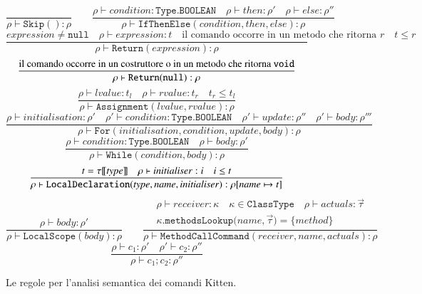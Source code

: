 \begin{figure}[t]
\begin{center}
{\small
  \[
    \frac{}
         {\rho\vdash\mathtt{Skip()}:\rho}\qquad
    \frac{\rho\vdash\mathit{condition}:\mathtt{Type.BOOLEAN}\quad
          \rho\vdash\mathit{then}:\rho'\quad
          \rho\vdash\mathit{else}:\rho''}
         {\rho\vdash\mathtt{IfThenElse(\mathit{condition},\mathit{then},
          \mathit{else}):\rho}}
  \]
  \[
    \frac{\mathit{expression}\not=\mathtt{null}\quad
          \rho\vdash\mathit{expression}:t\quad
          \text{il comando occorre in un metodo che ritorna $r$}
          \quad t\le r}
         {\rho\vdash\mathtt{Return(\mathit{expression})}:\rho}
  \]
  \[
    \frac{\text{il comando occorre in un costruttore o in un metodo che
                ritorna \texttt{void}}}
         {\rho\vdash\mathtt{Return(null)}:\rho}
  \]
  \[
    \frac{\rho\vdash\mathit{lvalue}:t_l\quad\rho\vdash\mathit{rvalue}:t_r
          \quad t_r\le t_l}
         {\rho\vdash\mathtt{Assignment(\mathit{lvalue},\mathit{rvalue})}:\rho}
  \]
  \[
    \frac{\rho\vdash\mathit{initialisation}:\rho'\quad
          \rho'\vdash\mathit{condition}:\mathtt{Type.BOOLEAN}\quad
          \rho'\vdash\mathit{update}:\rho''\quad
          \rho'\vdash\mathit{body}:\rho'''}
         {\rho\vdash\mathtt{For(\mathit{initialisation},\mathit{condition},
          \mathit{update},\mathit{body})}:\rho}
  \]
  \[
    \frac{\rho\vdash\mathit{condition}:\mathtt{Type.BOOLEAN}\quad
          \rho\vdash\mathit{body}:\rho'}
         {\rho\vdash\mathtt{While(\mathit{condition},\mathit{body})}:\rho}
  \]
  \[
    \frac{t={\tau[\![{\mathit{type}}]\!]}\quad\rho\vdash\mathit{initialiser}:i\quad 
          i\le t}
         {\rho\vdash\mathtt{LocalDeclaration(\mathit{type},\mathit{name},
          \mathit{initialiser})}:\rho[\mathit{name}\mapsto t]}
  \]
  \[
    \frac{\rho\vdash\mathit{body}:\rho'}
         {\rho\vdash\mathtt{LocalScope(\mathit{body})}:\rho}
    \qquad
     \frac{\begin{array}{c}
       \rho\vdash\mathit{receiver}:\kappa\quad\kappa\in\mathtt{ClassType}
         \quad\rho\vdash\mathit{actuals}:\vec{\tau}\\
       \kappa\mathtt{.methodsLookup(\mathit{name},}\vec{\tau})=
           \{\mathit{method}\}
       \end{array}}
          {\rho\vdash\mathtt{MethodCallCommand(\mathit{receiver},
           \mathit{name},\mathit{actuals})}:\rho}
  \]
  \[
    \frac{\rho\vdash c_1:\rho'\quad\rho'\vdash c_2:\rho''}
         {\rho\vdash c_1;c_2:\rho''}
  \]
}
\end{center}
\caption{Le regole per l'analisi semantica dei comandi Kitten.}
  \label{fig:analysis_commands}
\end{figure}
%
